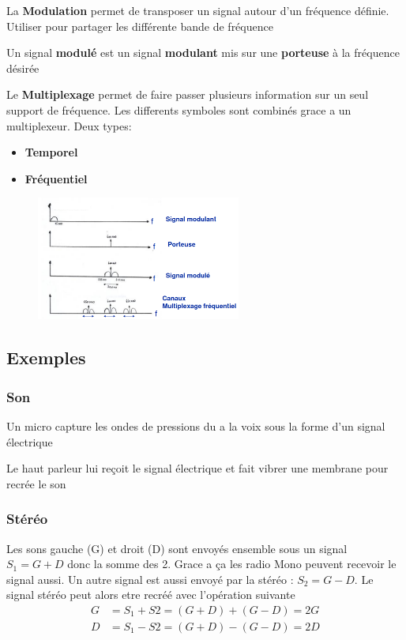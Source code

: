 \documentclass[12pt]{article}
\begin{document}
		La \textbf{Modulation} permet de transposer un signal autour d'un fréquence définie. Utiliser pour partager les différente bande de fréquence
		
		Un signal \textbf{modulé} est un signal \textbf{modulant} mis sur une \textbf{porteuse} à la fréquence désirée
		
		Le \textbf{Multiplexage} permet de faire passer plusieurs information sur un seul support de fréquence. Les differents symboles sont combinés grace a un multiplexeur. Deux types:
		\begin{itemize}
			\item \textbf{Temporel}
			\item \textbf{Fréquentiel}
		\end{itemize}
		\begin{figure}[htp]
			\centering
			\includegraphics[width=0.6\textwidth]{img/Multiplexage.png}
		\end{figure}
	\subsection{Exemples}
		\subsubsection{Son}
			Un micro capture les ondes de pressions du a la voix sous la forme d'un signal électrique
			
			Le haut parleur lui reçoit le signal électrique et fait vibrer une membrane pour recrée le son
			
			
		\subsubsection{Stéréo}
		
			Les sons gauche (G) et droit (D) sont envoyés ensemble sous un signal $S_1 = G+D$ donc la somme des 2. Grace a ça les radio Mono peuvent recevoir le signal aussi. Un autre signal est aussi envoyé par la stéréo : $S_2 = G-D$. Le signal stéréo peut alors etre recréé avec l'opération suivante
			\begin{align*} 
				G &=  S_1 + S2 = (G+D) + (G-D) = 2G \\ 		
				D &=  S_1 - S2 = (G+D) - (G-D) = 2D
			\end{align*}
		
\end{document}
